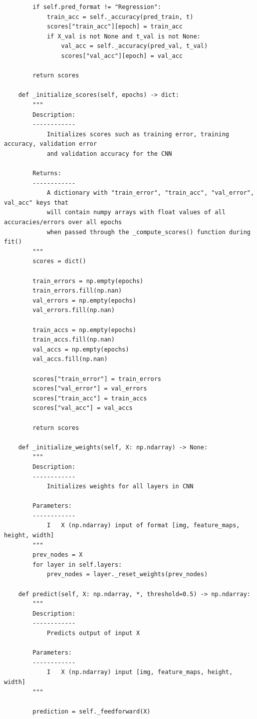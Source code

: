 \documentclass[%
oneside,                 %
final,                   %
10pt]{article}
\begin{document}
\begin{verbatim}
        if self.pred_format != "Regression":
            train_acc = self._accuracy(pred_train, t)
            scores["train_acc"][epoch] = train_acc
            if X_val is not None and t_val is not None:
                val_acc = self._accuracy(pred_val, t_val)
                scores["val_acc"][epoch] = val_acc

        return scores

    def _initialize_scores(self, epochs) -> dict:
        """
        Description:
        ------------
            Initializes scores such as training error, training accuracy, validation error
            and validation accuracy for the CNN

        Returns:
        ------------
            A dictionary with "train_error", "train_acc", "val_error", val_acc" keys that
            will contain numpy arrays with float values of all accuracies/errors over all epochs
            when passed through the _compute_scores() function during fit()
        """
        scores = dict()

        train_errors = np.empty(epochs)
        train_errors.fill(np.nan)
        val_errors = np.empty(epochs)
        val_errors.fill(np.nan)

        train_accs = np.empty(epochs)
        train_accs.fill(np.nan)
        val_accs = np.empty(epochs)
        val_accs.fill(np.nan)

        scores["train_error"] = train_errors
        scores["val_error"] = val_errors
        scores["train_acc"] = train_accs
        scores["val_acc"] = val_accs

        return scores

    def _initialize_weights(self, X: np.ndarray) -> None:
        """
        Description:
        ------------
            Initializes weights for all layers in CNN

        Parameters:
        ------------
            I   X (np.ndarray) input of format [img, feature_maps, height, width]
        """
        prev_nodes = X
        for layer in self.layers:
            prev_nodes = layer._reset_weights(prev_nodes)

    def predict(self, X: np.ndarray, *, threshold=0.5) -> np.ndarray:
        """
        Description:
        ------------
            Predicts output of input X

        Parameters:
        ------------
            I   X (np.ndarray) input [img, feature_maps, height, width]
        """

        prediction = self._feedforward(X)


\end{verbatim}
\end{document}
